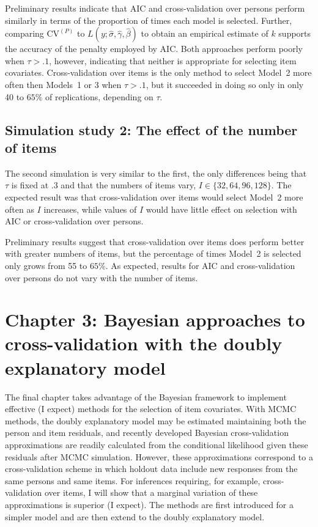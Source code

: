 \documentclass[letterpaper]{article}
\begin{document}
Preliminary results indicate that AIC and cross-validation over persons perform similarly in terms of the proportion of times each model is selected. Further, comparing $\mathrm{CV}^{(P)}$ to $L(y ; \hat \sigma, \hat \gamma, \hat \beta)$ to obtain an empirical estimate of $k$ supports the accuracy of the penalty employed by AIC. Both approaches perform poorly when $\tau > .1$, however, indicating that neither is appropriate for selecting item covariates. Cross-validation over items is the only method to select Model~2 more often then Models~1 or 3 when $\tau > .1$, but it succeeded in doing so only in only 40 to $65\%$ of replications, depending on $\tau$.


\subsection{Simulation study 2: The effect of the number of items}

The second simulation is very similar to the first, the only differences being that $\tau$ is fixed at .3 and that the numbers of items vary, $I \in \{32, 64, 96, 128 \}$. The expected result was that cross-validation over items would select Model~2 more often as $I$ increases, while values of $I$ would have little effect on selection with AIC or cross-validation over persons.

Preliminary results suggest that cross-validation over items does perform better with greater numbers of items, but the percentage of times Model~2 is selected only grows from 55 to $65\%$. As expected, results for AIC and cross-validation over persons do not vary with the number of items.


\section{Chapter 3: Bayesian approaches to cross-validation with the doubly explanatory model}

The final chapter takes advantage of the Bayesian framework to implement effective (I expect) methods for the selection of item covariates. 
With MCMC methods, the doubly explanatory model may be estimated maintaining both the person and item residuals, and recently developed Bayesian cross-validation approximations are readily calculated from the conditional likelihood given these residuals after MCMC simulation. 
However, these approximations correspond to a cross-validation scheme in which holdout data include new responses from the same persons and same items. 
For inferences requiring, for example, cross-validation over items, I will show that a marginal variation of these approximations is superior (I expect).
The methods are first introduced for a simpler model and are then extend to the doubly explanatory model.
\end{document}
